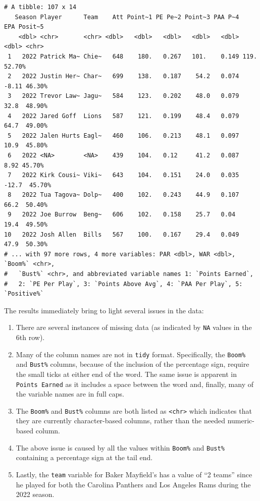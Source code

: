 \documentclass[
  letterpaper,
]{krantz}
\providecommand{\tightlist}{%
  \setlength{\itemsep}{0pt}\setlength{\parskip}{0pt}}\usepackage{longtable,booktabs,array}
\begin{document}
\begin{verbatim}
# A tibble: 107 x 14
   Season Player      Team    Att Point~1 PE Pe~2 Point~3 PAA P~4    EPA Posit~5
    <dbl> <chr>       <chr> <dbl>   <dbl>   <dbl>   <dbl>   <dbl>  <dbl> <chr>  
 1   2022 Patrick Ma~ Chie~   648    180.   0.267   101.    0.149 119.   52.70% 
 2   2022 Justin Her~ Char~   699    138.   0.187    54.2   0.074  -8.11 46.30% 
 3   2022 Trevor Law~ Jagu~   584    123.   0.202    48.0   0.079  32.8  48.90% 
 4   2022 Jared Goff  Lions   587    121.   0.199    48.4   0.079  64.7  49.00% 
 5   2022 Jalen Hurts Eagl~   460    106.   0.213    48.1   0.097  10.9  45.80% 
 6   2022 <NA>        <NA>    439    104.   0.12     41.2   0.087   8.92 45.70% 
 7   2022 Kirk Cousi~ Viki~   643    104.   0.151    24.0   0.035 -12.7  45.70% 
 8   2022 Tua Tagova~ Dolp~   400    102.   0.243    44.9   0.107  66.2  50.40% 
 9   2022 Joe Burrow  Beng~   606    102.   0.158    25.7   0.04   19.4  49.50% 
10   2022 Josh Allen  Bills   567    100.   0.167    29.4   0.049  47.9  50.30% 
# ... with 97 more rows, 4 more variables: PAR <dbl>, WAR <dbl>, `Boom%` <chr>,
#   `Bust%` <chr>, and abbreviated variable names 1: `Points Earned`,
#   2: `PE Per Play`, 3: `Points Above Avg`, 4: `PAA Per Play`, 5: `Positive%`
\end{verbatim}

The results immediately bring to light several issues in the data:

\begin{enumerate}
\def\labelenumi{\arabic{enumi}.}
\tightlist
\item
  There are several instances of missing data (as indicated by
  \texttt{NA} values in the 6th row).
\item
  Many of the column names are not in \texttt{tidy} format.
  Specifically, the \texttt{Boom\%} and \texttt{Bust\%} columns, because
  of the inclusion of the percentage sign, require the small ticks at
  either end of the word. The same issue is apparent in
  \texttt{Points\ Earned} as it includes a space between the word and,
  finally, many of the variable names are in full caps.
\item
  The \texttt{Boom\%} and \texttt{Bust\%} columns are both listed as
  \texttt{\textless{}chr\textgreater{}} which indicates that they are
  currently character-based columns, rather than the needed
  numeric-based column.
\item
  The above issue is caused by all the values within \texttt{Boom\%} and
  \texttt{Bust\%} containing a percentage sign at the tail end.
\item
  Lastly, the \texttt{team} variable for Baker Mayfield's has a value of
  ``2 teams'' since he played for both the Carolina Panthers and Los
  Angeles Rams during the 2022 season.
\end{enumerate}
\end{document}
